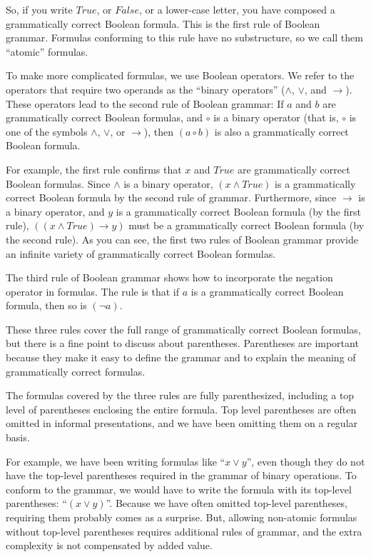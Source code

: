 So, if you write $True$, or $False$, or a lower-case letter, you have composed a grammatically correct Boolean formula. This is the first rule of Boolean grammar. Formulas conforming to this rule have no substructure, so we call them ``atomic'' formulas.

To make more complicated formulas, we use Boolean operators. We refer to the operators that require two operands as the ``binary operators'' ($\wedge$, $\vee$, and $\rightarrow$). These operators lead to the second rule of Boolean grammar: If $a$ and $b$ are grammatically correct Boolean formulas, and $\circ$ is a binary operator (that is, $\circ$ is one of the symbols $\wedge$, $\vee$, or $\rightarrow$), then $(a \circ b)$ is also a grammatically correct Boolean formula.

For example, the first rule confirms that $x$ and $True$ are grammatically correct Boolean formulas. Since $\wedge$ is a binary operator, $(x \wedge True)$ is a grammatically correct Boolean formula by the second rule of grammar. Furthermore, since $\rightarrow$ is a binary operator, and $y$ is a grammatically correct Boolean formula (by the first rule), $((x \wedge True) \rightarrow y)$ must be a grammatically correct Boolean formula (by the second rule). As you can see, the first two rules of Boolean grammar provide an infinite variety of grammatically correct Boolean formulas.

The third rule of Boolean grammar shows how to incorporate the negation operator in formulas. The rule is that if $a$ is a grammatically correct Boolean formula, then so is $(\neg a)$.

These three rules cover the full range of grammatically correct Boolean formulas, but there is a fine point to discuss about parentheses. Parentheses are important because they make it easy to define the grammar and to explain the meaning of grammatically correct formulas.

The formulas covered by the three rules are fully parenthesized, including a top level of parentheses enclosing the entire formula. Top level parentheses are often omitted in informal presentations, and we have been omitting them on a regular basis.

For example, we have been writing formulas like ``$x \vee y$'', even though they do not have the top-level parentheses required in the grammar of binary operations. To conform to the grammar, we would have to write the formula with its top-level parentheses: ``$(x \vee y)$''. Because we have often omitted top-level parentheses, requiring them probably comes as a surprise. But, allowing non-atomic formulas without top-level parentheses requires additional rules of grammar, and the extra complexity is not compensated by added value.

